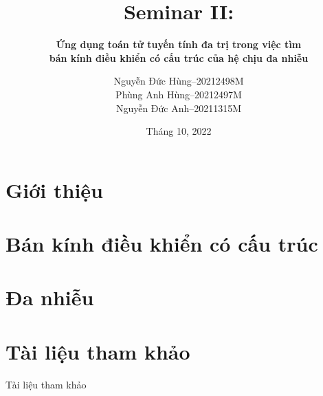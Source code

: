 \documentclass[aspectratio=169]{beamer}
\title{Seminar II:}
\subtitle{\textbf{Ứng dụng toán tử tuyến tính đa trị trong việc tìm\\bán kính điều khiển có cấu trúc của hệ chịu đa nhiễu}}
\author{Nguyễn Đức Hùng--20212498M\\Phùng Anh Hùng--20212497M\\Nguyễn Đức Anh--20211315M}
\date{Tháng 10, 2022}
\begin{document}
\begin{frame}
  \maketitle
\end{frame}

\section{Giới thiệu}


\section{Bán kính điều khiển có cấu trúc}

\section{Đa nhiễu}



\section{Tài liệu tham khảo}
\begin{frame}{Tài liệu tham khảo}
  \nocite{*}
  
  
\end{frame}

\begin{frame}{~}
  \Large \color{hustred}{Cảm ơn mọi người đã chú ý lắng nghe!}
\end{frame}
\end{document}
